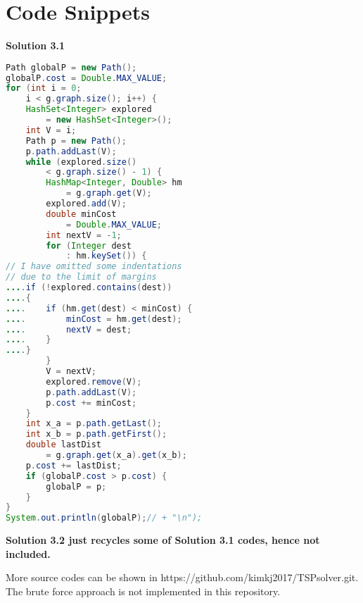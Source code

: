 \documentclass{acm_proc_article-sp}
\begin{document}
\section{Code Snippets}
\begin{flushleft}
\textbf{Solution 3.1}

\begin{lstlisting}[language=Java]
Path globalP = new Path();
globalP.cost = Double.MAX_VALUE;
for (int i = 0; 
    i < g.graph.size(); i++) {
	HashSet<Integer> explored
	    = new HashSet<Integer>();
	int V = i;
	Path p = new Path();
	p.path.addLast(V);
	while (explored.size() 
	    < g.graph.size() - 1) {
		HashMap<Integer, Double> hm
	    	= g.graph.get(V);
		explored.add(V);
		double minCost
	    	= Double.MAX_VALUE;
		int nextV = -1;
		for (Integer dest 
		    : hm.keySet()) {
// I have omitted some indentations
// due to the limit of margins
....if (!explored.contains(dest))
....{
....    if (hm.get(dest) < minCost) {
....        minCost = hm.get(dest);
....        nextV = dest;
....    }
....}
		}
		V = nextV;
		explored.remove(V);
		p.path.addLast(V);
		p.cost += minCost;
	}
	int x_a = p.path.getLast();
	int x_b = p.path.getFirst();
	double lastDist
	    = g.graph.get(x_a).get(x_b);
	p.cost += lastDist;
	if (globalP.cost > p.cost) {
		globalP = p;
	}
}
System.out.println(globalP);// + "\n");
\end{lstlisting}

\textbf{Solution 3.2 just recycles some of Solution 3.1 codes, hence not included.}

More source codes can be shown in https://github.com/kimkj2017/TSPsolver.git. The brute force approach is not implemented in this repository.
\end{flushleft}




\end{document}
